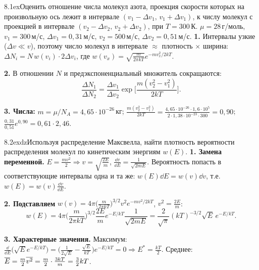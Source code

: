 \begin{problem}{8.1}{ex}{Оценить отношение числа молекул азота, проекция скорости которых на произвольную ось лежит в интервале
$(v_1-\Delta v_1,\,v_1+\Delta v_1)$, к числу молекул с проекцией в интервале $(v_2-\Delta v_2,\,v_2+\Delta v_2)$, при $T=300$\,К.
$\mu=28$\,г/моль, $v_1=300$\,м/с, $\Delta v_1=0{,}31$\,м/с, $v_2=500$\,м/с, $\Delta v_2=0{,}51$\,м/с.}
\textbf{1.} Интервалы узкие ($\Delta v\ll v$), поэтому число молекул в интервале $\approx$ плотность $\times$ ширина:
$\Delta N_i=N\,w(v_i)\cdot2\Delta v_i$, где $w(v_x)=\sqrt{\frac m{2\pi kT}}e^{-mv_x^2/2kT}$.

\textbf{2.} В отношении $N$ и предэкспоненциальный множитель сокращаются:
\[\frac{\Delta N_1}{\Delta N_2}=\frac{\Delta v_1}{\Delta v_2}\exp\Big[\frac{m(v_2^2-v_1^2)}{2kT}\Big].\]

\textbf{3. Числа:} $m=\mu/N_A=4{,}65\cdot10^{-26}$\,кг;\;
$\frac{m(v_2^2-v_1^2)}{2kT}=\frac{4{,}65\cdot10^{-26}\cdot1{,}6\cdot10^5}{2\cdot1{,}38\cdot10^{-23}\cdot300}=0{,}90$;\;
$\frac{0{,}31}{0{,}51}e^{0{,}90}=0{,}61\cdot2{,}46$.
\end{problem}

\begin{problem}{8.2}{exdz}{Используя распределение Максвелла, найти плотность вероятности распределения молекул по кинетическим энергиям $w(E)$.}
\textbf{1. Замена переменной.} $E=\frac{mv^2}{2}\Rightarrow v=\sqrt{\frac{2E}{m}}$, $\frac{\dd v}{\dd E}=\frac{1}{\sqrt{2mE}}$.
Вероятность попасть в соответствующие интервалы одна и та же: $w(E)\dd E=w(v)\dd v$, т.е.\ $w(E)=w(v)\frac{\dd v}{\dd E}$.

\textbf{2. Подставляем} $w(v)=4\pi\big(\frac m{2\pi kT}\big)^{3/2}v^2e^{-mv^2/2kT}$, $v^2=\frac{2E}m$:
\[w(E)=4\pi\Big(\frac m{2\pi kT}\Big)^{3/2}\frac{2E}{m}e^{-E/kT}\frac{1}{\sqrt{2mE}}=\frac{2}{\sqrt\pi}(kT)^{-3/2}\sqrt E\,e^{-E/kT}.\]

\textbf{3. Характерные значения.} Максимум: $\frac{\dd}{\dd E}\big(\sqrt Ee^{-E/kT}\big)=\big(\frac{1}{2\sqrt E}-\frac{\sqrt E}{kT}\big)e^{-E/kT}=0\Rightarrow E^*=\frac{kT}2$.
Среднее: $\overline{E}=\frac m2\overline{v^2}=\frac m2\cdot\frac{3kT}m=\frac32kT$.
\end{problem}


